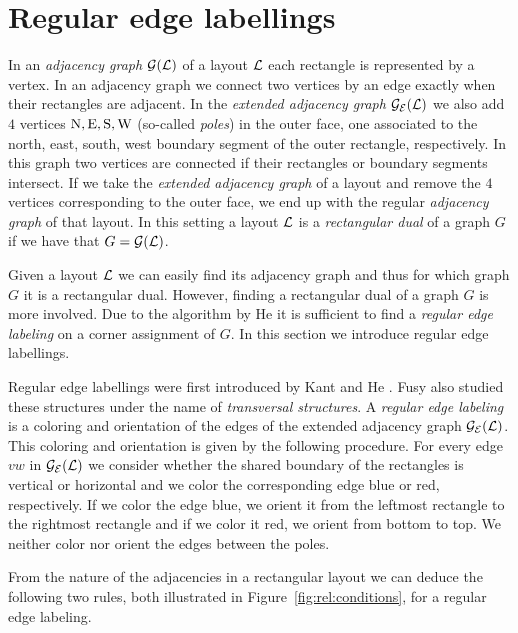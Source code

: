 
\section{Regular edge labellings}
\label{s:rel}
\thispagestyle{plain}
  In an \emph{adjacency graph} $\mathcal{G}(\mathcal{L})$ of a layout $\mathcal{L}$ each rectangle is represented by a vertex.
  In an adjacency graph we connect two vertices by an edge exactly when their rectangles are adjacent.
  In the \emph{extended adjacency graph} $\mathcal{G}_{\mathcal{E}}(\mathcal{L})$ we also add $4$ vertices $\mathrm{N}, \mathrm{E}, \mathrm{S}, \mathrm{W}$ (so-called \emph{poles}) in the outer face, one associated to the north, east, south, west boundary segment of the outer rectangle, respectively.
  In this graph two vertices are connected if their rectangles or boundary segments intersect.
  If we take the \emph{extended adjacency graph} of a layout and remove the $4$ vertices corresponding to the outer face, we end up with the regular \emph{adjacency graph} of that layout.
  In this setting a layout $\mathcal{L}$ is a \emph{rectangular dual} of a graph $G$ if we have that $G = \mathcal{G}(\mathcal{L})$.

  Given a layout $\mathcal{L}$ we can easily find its adjacency graph and thus for which graph $G$ it is a rectangular dual. However, finding a rectangular dual of a graph $G$ is more involved. Due to the algorithm by He \cite{He1993} it is sufficient to find a \emph{regular edge labeling} on a corner assignment of $G$. In this section we introduce regular edge labellings.

  Regular edge labellings were first introduced by Kant and He \cite{Kant1997}.
  Fusy also studied these structures \cite{Fusy2009, Fusy2006} under the name of \emph{transversal structures}.
  A \emph{regular edge labeling} is a coloring and orientation of the edges of the extended adjacency graph $\mathcal{G}_{\mathcal{E}}(\mathcal{L})$.
  This coloring and orientation is given by the following procedure.
  For every edge $vw$ in $\mathcal{G}_{\mathcal{E}}(\mathcal{L})$ we consider whether the shared boundary of the rectangles is vertical or horizontal and we color the corresponding edge blue or red, respectively.
  If we color the edge blue, we orient it from the leftmost rectangle to the rightmost rectangle and if we color it red, we orient from bottom to top.
  We neither color nor orient the edges between the poles.

  From the nature of the adjacencies in a rectangular layout we can deduce the following two rules, both illustrated in Figure~\ref{fig:rel:conditions}, for a regular edge labeling.

